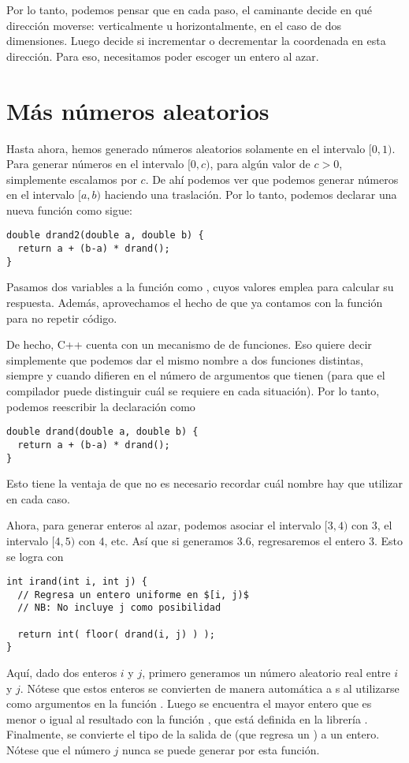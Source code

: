Por lo tanto, podemos pensar que en cada paso, el caminante decide en qué
dirección moverse: verticalmente u horizontalmente, en el caso de dos
dimensiones.  Luego decide si incrementar o decrementar la coordenada en esta
dirección.  Para eso, necesitamos poder escoger un entero al azar.

\section{Más números aleatorios}
Hasta ahora, hemos generado números aleatorios solamente en el intervalo
$[0,1)$. Para generar números en el intervalo $[0,c)$, para algún valor de
$c>0$, simplemente escalamos por $c$. De ahí podemos ver que podemos generar
números en el intervalo $[a,b)$ haciendo una traslación. Por lo tanto, podemos
declarar una nueva función como sigue:
\begin{lstlisting}
double drand2(double a, double b) {
  return a + (b-a) * drand();
}
\end{lstlisting}
Pasamos dos variables a la función como , cuyos valores
emplea para calcular su respuesta. Además, aprovechamos el hecho de que ya
contamos con la función  para no repetir código.

De hecho, C++ cuenta con un mecanismo de  de funciones. Eso
quiere decir simplemente que podemos dar el mismo nombre a dos funciones
distintas, siempre y cuando difieren en el número de argumentos que tienen
(para que el compilador puede distinguir cuál se requiere en cada
situación). Por lo tanto, podemos reescribir la declaración como
\begin{lstlisting}
double drand(double a, double b) {
  return a + (b-a) * drand();
}
\end{lstlisting}
Esto tiene la ventaja de que no es necesario recordar cuál nombre hay que
utilizar en cada caso.

Ahora, para generar enteros al azar, podemos asociar el intervalo $[3,4)$ con
$3$, el intervalo $[4,5)$ con $4$, etc. Así que si generamos $3.6$,
regresaremos el entero $3$. Esto se logra con
\begin{lstlisting}
int irand(int i, int j) {
  // Regresa un entero uniforme en $[i, j)$
  // NB: No incluye j como posibilidad

  return int( floor( drand(i, j) ) );
}
\end{lstlisting}
Aquí, dado dos enteros $i$ y $j$, primero generamos un número aleatorio real
entre $i$ y $j$. Nótese que estos enteros se convierten de manera automática a
s al utilizarse como argumentos en la función .
Luego se encuentra el mayor entero que es menor o igual al resultado con la
función , que está definida en la librería .
Finalmente, se convierte el tipo de la salida de  (que regresa un
) a un entero.  Nótese que el número $j$ nunca se puede generar por
esta función. 

